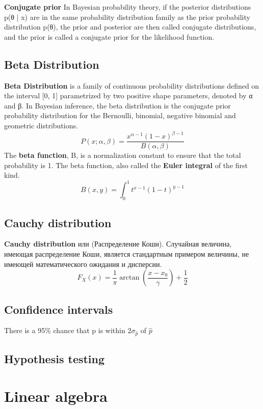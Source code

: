 \documentclass{book}
\begin{document}
\textbf{Conjugate prior} 
In Bayesian probability theory, if the posterior distributions p(θ | x) are in the same probability distribution family as the prior probability distribution p(θ), the prior and posterior are then called conjugate distributions, and the prior is called a conjugate prior for the likelihood function.

\section{Beta Distribution}
\textbf{Beta Distribution} is a family of continuous probability distributions defined on the interval [0, 1] parametrized by two positive shape parameters, denoted by α and β. In Bayesian inference, the beta distribution is the conjugate prior probability distribution for the Bernoulli, binomial, negative binomial and geometric distributions.$$P(x; \alpha, \beta)=\frac{x^{\alpha - 1}(1-x)^{\beta -1}}{B(\alpha,\beta)}$$The \textbf{beta function}, 
B, is a normalization constant to ensure that the total probability is 1. The beta function, also called the \textbf{Euler integral} of the first kind. $$B(x, y)=\int_{0}^{1}t^{x-1}(1-t)^{y-1}$$
\section{Cauchy distribution}
\textbf{Cauchy distribution}  или (Распределение Коши). Случайная величина, имеющая распределение Коши, является стандартным примером величины, не имеющей математического ожидания и дисперсии.
$$F_X(x)=\frac{1}{\pi}\arctan \left(\frac{x-x_0}{\gamma}\right) + \frac{1}{2}$$
\section{Confidence intervals}

There is a 95\% chance that p is within $2\sigma_{\hat p}$ of $\hat p$

\section{Hypothesis testing}

\chapter{Linear algebra}
\end{document}
